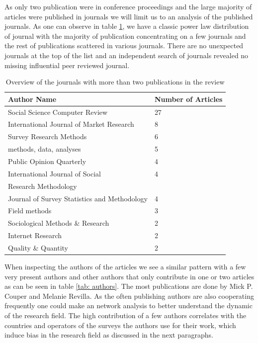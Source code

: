 As only two publication were in conference proceedings and the large majority of articles were published in journals we will limit us to an analysis of the published journals. As one can observe in table \ref{tab: journals}, we have a classic power law distribution of journal with the majority of publication concentrating on a few journals and the rest of publications scattered in various journals. There are no unexpected journals at the top of the list and an independent search of journals revealed no missing influential peer reviewed journal. 

\begin{table}
	\centering
	\begin{tabular}{ll}
		\toprule
		Author Name & Number of Articles \\
		\midrule
        Social Science Computer Review & 27\\
        International Journal of Market Research & 8\\
        Survey Research Methods& 6\\
        methods, data, analyses & 5\\
        Public Opinion Quarterly & 4\\
        International Journal of Social & 4 \\
        Research Methodology & \\
        Journal of Survey Statistics and Methodology & 4\\
        Field methods & 3\\
        Sociological Methods \& Research & 2\\
        Internet Research & 2 \\
        Quality \& Quantity  & 2\\
		\bottomrule 
	\end{tabular}
	\caption{Overview of the journals with more than two publications in the review}
	\label{tab: journals}
\end{table}

When inspecting the authors of the articles we see a similar pattern with a few very present authors and other authors that only contribute in one or two articles as can be seen in table \ref{tab: authors}. The most publications are done by Mick P. Couper and Melanie Revilla. As the often publishing authors are also cooperating frequently one could make an network analysis to better understand the dynamic of the research field. The high contribution of a few authors correlates with the countries and operators of the surveys the authors use for their work, which induce bias in the research field as discussed in the next paragraphs.

